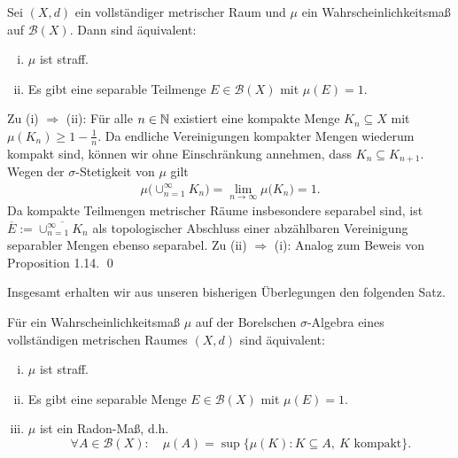 \begin{proposition}
    Sei $(X,d)$ ein vollständiger metrischer Raum und $\mu$ ein Wahrscheinlichkeitsmaß auf $\mathcal{B}(X)$. Dann sind äquivalent:
    \begin{enumerate}[(i)]
        \item $\mu$ ist straff.
        \item Es gibt eine separable Teilmenge $E \in \mathcal{B}(X)$ mit $\mu(E) = 1$. 
    \end{enumerate}
\end{proposition}
\begin{proof*}
    Zu (i) $\Rightarrow$ (ii): Für alle $n \in \mathbb{N}$ existiert eine kompakte Menge $K_n \subseteq X$ mit \mbox{$\mu(K_n) \geq 1 - \frac{1}{n}$}.
    Da endliche Vereinigungen kompakter Mengen wiederum kompakt sind, können wir ohne Einschränkung annehmen, dass $K_n \subseteq K_{n+1}$. 
    Wegen der $\sigma$-Stetigkeit von $\mu$ gilt  
    \begin{align*}
        \mu\big(\cup_{n=1}^{\infty}K_n\big) = \lim_{n \to \infty}\mu\big(K_ n\big) = 1. 
    \end{align*}
    Da kompakte Teilmengen metrischer Räume insbesondere separabel sind, ist $\overline{E} := \overline{\cup_{n=1}^{\infty}K_n}$ als topologischer Abschluss einer abzählbaren Vereinigung separabler Mengen ebenso separabel. 
    \newline 
    Zu (ii) $\Rightarrow$ (i): 
    Analog zum Beweis von Proposition 1.14. \qed
\end{proof*}

Insgesamt erhalten wir aus unseren bisherigen Überlegungen den folgenden Satz. 

\begin{theorem}
    Für ein Wahrscheinlichkeitsmaß $\mu$ auf der Borelschen $\sigma$-Algebra eines vollständigen metrischen Raumes $(X,d)$ sind äquivalent:
    \begin{enumerate}[(i)]
        \item $\mu$ ist straff.
        \item Es gibt eine separable Menge $E \in \mathcal{B}(X)$ mit $\mu(E) = 1$.
        \item $\mu$ ist ein Radon-Maß, d.h.
        $$
        \forall A \in \mathcal{B}(X): \quad \mu(A) = \sup\{\mu(K): K \subseteq A, \ K \text{ kompakt}\}.
        $$   
    \end{enumerate}
\end{theorem}

